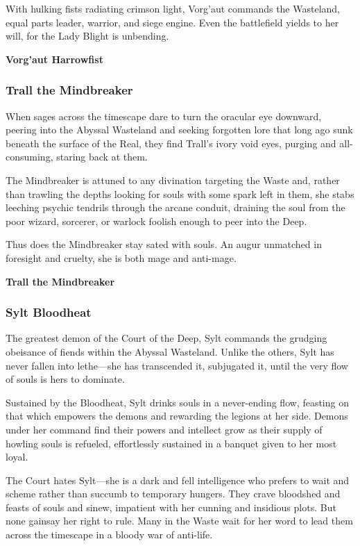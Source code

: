 \documentclass[10pt,a4paper,twoside,bg=print,twocolumn,openany,nodeprecatedcode]{dndbook}
\begin{document}
With hulking fists radiating crimson light, Vorg'aut commands the Wasteland, equal parts leader, warrior, and siege engine. Even the battlefield yields to her will, for the Lady Blight is unbending.

\textbf{Vorg'aut Harrowfist}

\subsubsection{Trall the Mindbreaker}
When sages across the timescape dare to turn the oracular eye downward, peering into the Abyssal Wasteland and seeking forgotten lore that long ago sunk beneath the surface of the Real, they find Trall's ivory void eyes, purging and all-consuming, staring back at them.

The Mindbreaker is attuned to any divination targeting the Waste and, rather than trawling the depths looking for souls with some spark left in them, she stabs leeching psychic tendrils through the arcane conduit, draining the soul from the poor wizard, sorcerer, or warlock foolish enough to peer into the Deep.

Thus does the Mindbreaker stay sated with souls. An augur unmatched in foresight and cruelty, she is both mage and anti-mage.

\textbf{Trall the Mindbreaker}

\subsubsection{Sylt Bloodheat}
The greatest demon of the Court of the Deep, Sylt commands the grudging obeisance of fiends within the Abyssal Wasteland. Unlike the others, Sylt has never fallen into lethe—she has transcended it, subjugated it, until the very flow of souls is hers to dominate.

Sustained by the Bloodheat, Sylt drinks souls in a never-ending flow, feasting on that which empowers the demons and rewarding the legions at her side. Demons under her command find their powers and intellect grow as their supply of howling souls is refueled, effortlessly sustained in a banquet given to her most loyal.

The Court hates Sylt—she is a dark and fell intelligence who prefers to wait and scheme rather than succumb to temporary hungers. They crave bloodshed and feasts of souls and sinew, impatient with her cunning and insidious plots. But none gainsay her right to rule. Many in the Waste wait for her word to lead them across the timescape in a bloody war of anti-life.
\end{document}
